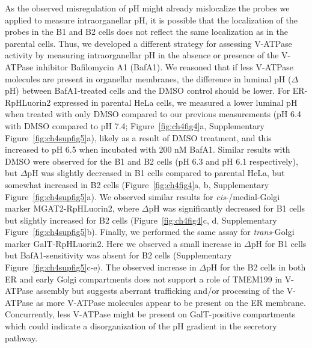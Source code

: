 As the observed misregulation of pH might already mislocalize the probes we applied to measure intraorganellar pH, it is possible that the localization of the probes in the B1 and B2 cells does not reflect the same localization as in the parental cells. Thus, we developed a different strategy for assessing V-ATPase activity by measuring intraorganellar pH in the absence or presence of the V-ATPase inhibitor Bafilomycin A1 (BafA1)\cite{huss_inhibitors_2009}. We reasoned that if less V-ATPase molecules are present in organellar membranes, the difference in luminal pH ($\Delta$pH) between BafA1-treated cells and the DMSO control should be lower. For ER-RpHLuorin2 expressed in parental HeLa cells, we measured a lower luminal pH when treated with only DMSO compared to our previous measurements (pH 6.4 with DMSO compared to pH 7.4; Figure~\ref{fig:ch4fig4}a, Supplementary Figure~\ref{fig:ch4supfig5}a), likely as a result of DMSO treatment, and this increased to pH 6.5 when incubated with 200 nM BafA1. Similar results with DMSO were observed for the B1 and B2 cells (pH 6.3 and pH 6.1 respectively), but $\Delta$pH was slightly decreased in B1 cells compared to parental HeLa, but somewhat increased in B2 cells (Figure~\ref{fig:ch4fig4}a, b, Supplementary Figure~\ref{fig:ch4supfig5}a). We observed similar results for \emph{cis}-/medial-Golgi marker MGAT2-RpHLuorin2, where $\Delta$pH was significantly decreased for B1 cells but slightly increased for B2 cells (Figure~\ref{fig:ch4fig4}c, d, Supplementary Figure~\ref{fig:ch4supfig5}b). Finally, we performed the same assay for \emph{trans}-Golgi marker GalT-RpHLuorin2. Here we observed a small increase in $\Delta$pH for B1 cells but BafA1-sensitivity was absent for B2 cells (Supplementary Figure~\ref{fig:ch4supfig5}c-e). The observed increase in $\Delta$pH for the B2 cells in both ER and early Golgi compartments does not support a role of TMEM199 in V-ATPase assembly but suggests aberrant trafficking and/or processing of the V-ATPase as more V-ATPase molecules appear to be present on the ER membrane. Concurrently, less V-ATPase might be present on GalT-positive compartments which could indicate a disorganization of the pH gradient in the secretory pathway.

